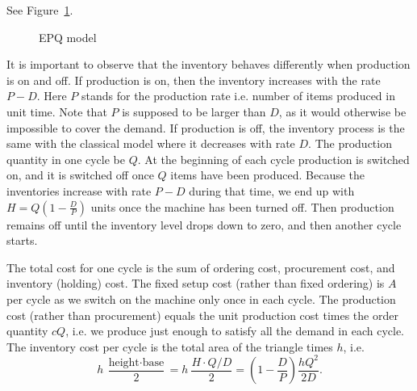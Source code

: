 \begin{solution}

See Figure~\ref{fig:EPQ}.

\begin{figure}[htbp]
\centering
\small
{}
\caption{EPQ model}
\label{fig:EPQ}
\end{figure}


It is important to observe that the inventory behaves differently when production is on and off. If production is on, then the inventory increases with the rate $P-D$. Here $P$ stands for the production rate i.e. number of items produced in unit time. Note that $P$ is supposed to be larger than $D$, as it would otherwise be impossible to cover the demand. If production is off, the inventory process is the same with the classical model where it decreases with rate $D$. The production quantity in one cycle be $Q$. At the beginning of each cycle production is switched on, and it is switched off once $Q$ items have been produced. Because the inventories increase with rate $P-D$ during that time, we end up with $H=Q(1-\frac{D}{P})$ units once the machine has been turned off. Then production remains off until the inventory level drops down to zero, and then another cycle starts.

The total cost for one cycle is the sum of ordering cost, procurement cost, and inventory (holding) cost. The fixed setup cost (rather than fixed ordering) is $A$ per cycle as we switch on the machine only once in each cycle. The production cost (rather than procurement) equals the unit production cost times the order quantity $cQ$, i.e. we produce just enough to satisfy all the demand in each cycle. The inventory cost per cycle is the total area of the triangle times $h$, i.e. 
\begin{equation*}
h~\frac{\text{height}\cdot\text{base}}{2} = h~\frac{H \cdot Q/D }{2} = \left(1-\frac{D}{P}\right) \frac{h Q^2}{2D}.
\end{equation*}


\end{solution}
